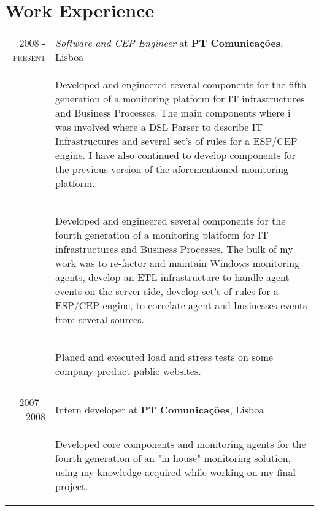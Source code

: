 \documentclass[a4paper,10pt]{article}
\begin{document}
\section{Work Experience}
\begin{tabular}{rp{11cm}}
  \textsc{2008 - present} & \emph{Software and CEP Engineer} at \textbf{PT Comunicações}, Lisboa\\ 
  & \begin{compactitem} 
     \item Developed and engineered several components for the fifth generation of a monitoring platform for IT infrastructures and Business Processes. The main components where i was involved
     where a DSL Parser to describe IT Infrastructures and several set's of rules for a ESP/CEP engine. I have also continued to develop components for the previous version of the aforementioned
     monitoring platform.
     \end{compactitem}\vspace{-1em} \\
  & \begin{compactitem} 
     \item Developed and engineered several components for the fourth generation of a monitoring platform for IT infrastructures and Business Processes.
     The bulk of my work was to re-factor and maintain Windows monitoring agents, develop an ETL infrastructure to handle agent events on the server side, develop set's of rules for a ESP/CEP 
     engine,  to correlate agent and businesses events from several sources.
     \end{compactitem}\vspace{-1em} \\
  & \begin{compactitem} 
     \item Planed and executed load and stress tests on some company product public websites.
     \end{compactitem}\vspace{-1em} \\
\multicolumn{2}{c}{} \\
  \textsc{2007 - 2008} & Intern developer at \textbf{PT Comunicações}, Lisboa\\ 
   & \begin{compactitem}
   \item Developed core components and monitoring agents for the fourth generation of an "in house" monitoring solution, using my knowledge acquired while working on my final project.

\end{compactitem}
\end{tabular}
\end{document}
